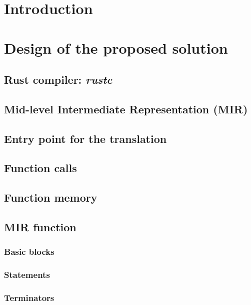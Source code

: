 \documentclass[12pt, oneside]{book}
\begin{document}




\chapter{Introduction}









\bigskip

\chapter{Design of the proposed solution}

\section{Rust compiler: \emph{rustc}}
\section{Mid-level Intermediate Representation (MIR)}
\section{Entry point for the translation}
\section{Function calls}
\section{Function memory}
\section{MIR function}
\subsection{Basic blocks}
\subsection{Statements}
\subsection{Terminators}
\end{document}
